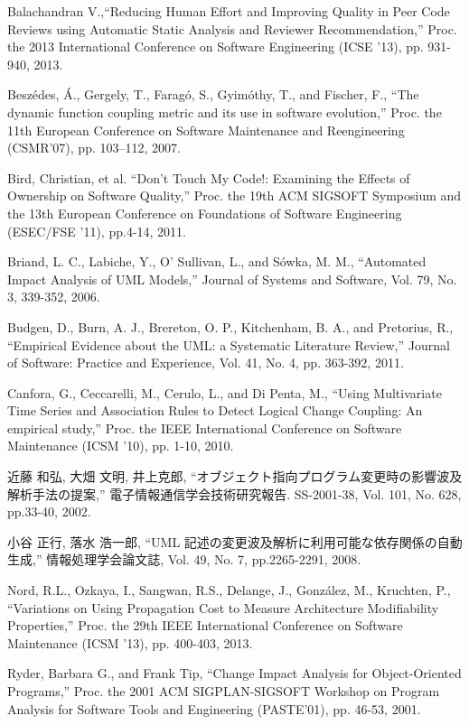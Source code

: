 \documentclass{fose2016}           %
\begin{document}
\begin{thebibliography}{10}
Balachandran V.,``Reducing Human Effort and Improving Quality in Peer Code Reviews using Automatic Static Analysis and Reviewer Recommendation,'' Proc. the 2013 International Conference on Software Engineering (ICSE '13), pp. 931-940, 2013.

Besz\'edes, \'A., Gergely, T., Farag\'o, S., Gyim\'othy, T., and Fischer, F.,
``The  dynamic  function  coupling  metric  and  its  use  in  software evolution,'' Proc. the 11th  European  Conference on Software Maintenance and Reengineering (CSMR’07), pp. 103–112, 2007.

Bird, Christian, et al. ``Don't Touch My Code!: Examining the Effects of Ownership on Software Quality,'' Proc. the 19th ACM SIGSOFT Symposium and the 13th European Conference on Foundations of Software Engineering (ESEC/FSE '11), pp.4-14, 2011.

Briand, L. C., Labiche, Y., O' Sullivan, L., and Sówka, M. M., ``Automated Impact Analysis of UML Models,'' Journal of Systems and Software, Vol. 79, No. 3, 339-352, 2006.

Budgen, D., Burn, A. J., Brereton, O. P., Kitchenham, B. A., and Pretorius, R., ``Empirical Evidence about the UML: a Systematic Literature Review,'' Journal of Software: Practice and Experience, Vol. 41, No. 4, pp. 363-392, 2011.

Canfora, G., Ceccarelli, M., Cerulo, L., and Di Penta, M., ``Using Multivariate Time Series and Association Rules to Detect Logical Change Coupling: An empirical study,'' Proc. the IEEE International Conference on Software Maintenance (ICSM '10), pp. 1-10, 2010.

近藤 和弘, 大畑 文明, 井上克郎, ``オブジェクト指向プログラム変更時の影響波及解析手法の提案,'' 電子情報通信学会技術研究報告. SS-2001-38, Vol. 101, No. 628, pp.33-40, 2002.

小谷 正行, 落水 浩一郎, ``UML 記述の変更波及解析に利用可能な依存関係の自動生成,'' 情報処理学会論文誌, Vol. 49, No. 7, pp.2265-2291, 2008.

Nord, R.L., Ozkaya, I., Sangwan, R.S., Delange, J., González, M., Kruchten, P., ``Variations on Using Propagation Cost to Measure Architecture Modifiability Properties,'' Proc. the 29th IEEE International Conference on Software Maintenance (ICSM '13), pp. 400-403, 2013.

Ryder, Barbara G., and Frank Tip, ``Change Impact Analysis for Object-Oriented Programs,'' Proc. the 2001 ACM SIGPLAN-SIGSOFT Workshop on Program Analysis for Software Tools and Engineering (PASTE'01), pp. 46-53, 2001.


\end{thebibliography}
\end{document}
